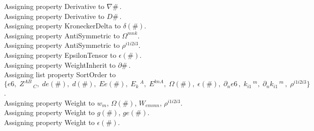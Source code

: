\documentclass[11pt]{article}
\begin{document}
Assigning property Derivative to $\nabla{\#}\, $.
\\
Assigning property Derivative to $D{\#}\, $.
\\
Assigning property KroneckerDelta to $\delta(\#)$.
\\
Assigning property AntiSymmetric to ${\Omega}^{m n k}$.
\\
Assigning property AntiSymmetric to ${\rho}^{i1 i2 i3}$.
\\
Assigning property EpsilonTensor to $\epsilon(\#)$.
\\
Assigning property WeightInherit to $\partial{\#}\, $.
\\
Assigning list property SortOrder to $\{e6,\; {Z}^{A B}\,_{C},\; de(\#),\; d(\#),\; Ee(\#),\; {E}_{k}\,^{A},\; {E}^{k n A},\; \Omega(\#),\; \epsilon(\#),\; {\partial}_{n}{e6}\, ,\; {k}_{i1}\,^{m},\; {\partial}_{n}{{k}_{i1}\,^{m}}\, ,\; {\rho}^{i1 i2 i3}\}$.
\\
Assigning property Weight to ${w}_{m}$, $\Omega(\#)$, ${W}_{em m n}$, ${\rho}^{i1 i2 i3}$.
\\
Assigning property Weight to $g(\#)$, $ge(\#)$.
\\
Assigning property Weight to $\epsilon(\#)$.
\\
\end{document}
